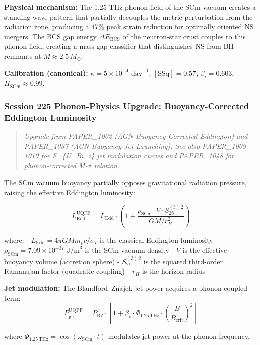 \textbf{Physical mechanism:} The 1.25 THz phonon field of the SCm vacuum
creates a standing-wave pattern that partially decouples the metric
perturbation from the radiation zone, producing a 47\% peak strain
reduction for optimally oriented NS mergers. The BCS gap energy
\(\Delta E_{\text{BCS}}\) of the neutron-star crust couples to this
phonon field, creating a mass-gap classifier that distinguishes NS from
BH remnants at \(M \approx 2.5\,M_\odot\).

\textbf{Calibration (canonical):}
\(\kappa = 5 \times 10^{-4}\;\text{day}^{-1}\), \([\text{SSq}] = 0.57\),
\(\beta_i = 0.603\), \(H_{\text{SCm}} \approx 0.99\).

\subsubsection{Session 225 Phonon-Physics Upgrade: Buoyancy-Corrected
Eddington
Luminosity}\label{session-225-phonon-physics-upgrade-buoyancy-corrected-eddington-luminosity}

\begin{quote}
\emph{Upgrade from PAPER\_1002 (AGN Buoyancy-Corrected Eddington) and
PAPER\_1037 (AGN Buoyancy Jet Launching). See also PAPER\_1009-1010 for
F\_\{U\_Bi\_i\} jet modulation curves and PAPER\_1048 for
phonon-corrected M-\(\sigma\) relation.}
\end{quote}

The SCm vacuum buoyancy partially opposes gravitational radiation
pressure, raising the effective Eddington luminosity:

\[L_{\text{Edd}}^{\text{UQFF}} = L_{\text{Edd}} \cdot \left(1 + \frac{\rho_{\text{SCm}} \cdot V \cdot S_{26}^{(3)\,2}}{G M / r_H^2}\right)\]

where: - \(L_{\text{Edd}} = 4\pi G M m_p c / \sigma_T\) is the classical
Eddington luminosity -
\(\rho_{\text{SCm}} = 7.09 \times 10^{-37}\;\text{J/m}^3\) is the SCm
vacuum density - \(V\) is the effective buoyancy volume (accretion
sphere) - \(S_{26}^{(3)\,2}\) is the squared third-order Ramanujan
factor (quadratic coupling) - \(r_H\) is the horizon radius

\textbf{Jet modulation:} The Blandford--Znajek jet power acquires a
phonon-coupled term:
\[P_{\text{jet}}^{\text{UQFF}} = P_{\text{BZ}} \cdot \left[1 + \beta_i \cdot \Phi_{1.25\,\text{THz}} \cdot \left(\frac{B}{B_{\text{crit}}}\right)^2\right]\]

where \(\Phi_{1.25\,\text{THz}} = \cos(\omega_{\text{SCm}} \cdot t)\)
modulates jet power at the phonon frequency.

